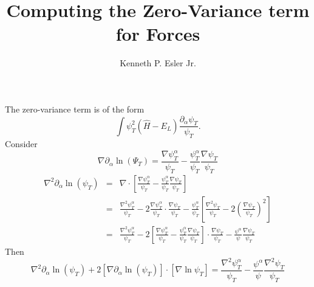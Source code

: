 \documentclass[letterpaper]{article}
\author{Kenneth P. Esler Jr.}
\title{Computing the Zero-Variance term for Forces}
\begin{document}
\maketitle
The zero-variance term is of the form
\begin{equation}
\int \psi_T^2 (\hat{H} - E_L) \frac{\partial_\alpha \psi_T}{\psi_T}.
\end{equation}
Consider
\begin{equation}
\nabla \partial_\alpha \ln(\Psi_T) = \frac{\nabla \psi^\alpha_T}{\psi_T} - \frac{\psi^\alpha_T}{\psi_T} \frac{\nabla \psi_T}{\psi_T} 
\end{equation}
\begin{eqnarray}
\nabla^2\partial_\alpha \ln(\psi_T) & = & \nabla\cdot \left[
\frac{\nabla \psi^\alpha_T}{\psi_T} - \frac{\psi^\alpha_T}{\psi_T} \frac{\nabla \psi_T}{\psi_T} \right] \\
& = & \frac{\nabla^2 \psi^\alpha_T}{\psi_T} - 2\frac{\nabla \psi^{\alpha}_T}{\psi_T} \cdot \frac{\nabla \psi_T}{\psi_T} - \frac{\psi^\alpha_T}{\psi_T} \left[\frac{\nabla^2\psi_T}{\psi_T} - 2\left(\frac{\nabla\psi_T}{\psi_T}\right)^2\right] \\
& = & \frac{\nabla^2 \psi_T^\alpha}{\psi_T} - 2\left[\frac{\nabla \psi_T^\alpha}{\psi_T} - \frac{\psi^\alpha_T}{\psi_T}\frac{\nabla\psi_T}{\psi_T}\right]\cdot \frac{\nabla \psi_T}{\psi_T} - \frac{\psi^\alpha}{\psi} \frac{\nabla \psi_T}{\psi_T} 
\end{eqnarray}
Then
\begin{equation}
 \nabla^2 \partial_\alpha \ln(\psi_T) + 2 \left[\nabla \partial_\alpha \ln(\psi_T)\right]\cdot \left[\nabla \ln{\psi_T}\right]  =  \frac{\nabla^2 \psi_T^\alpha}{\psi_T} - \frac{\psi^\alpha}{\psi} \frac{\nabla^2 \psi_T}{\psi_T}
\end{equation}
\end{document}
